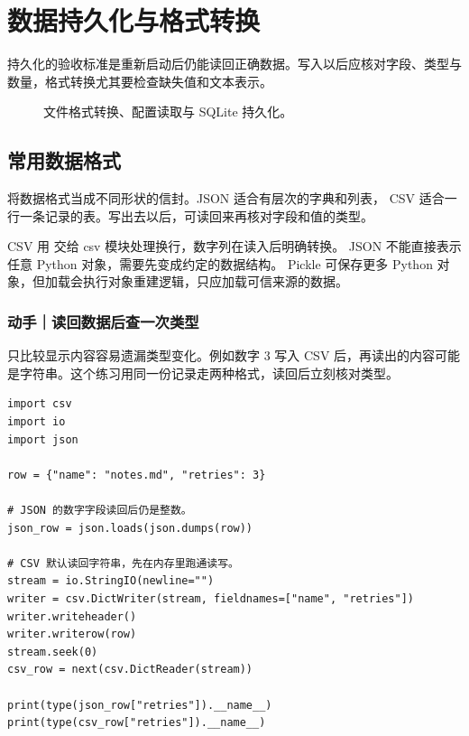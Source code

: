 \chapter{数据持久化与格式转换}
\label{ch:10-outline}

持久化的验收标准是重新启动后仍能读回正确数据。写入以后应核对字段、类型与数量，格式转换尤其要检查缺失值和文本表示。


\begin{figure}[htbp]
  \centering
  \caption*{文件格式转换、配置读取与 SQLite 持久化。}
\end{figure}


\section{常用数据格式}

将数据格式当成不同形状的信封。JSON 适合有层次的字典和列表，
CSV 适合一行一条记录的表。写出去以后，可读回来再核对字段和值的类型。

CSV 用  交给 csv 模块处理换行，数字列在读入后明确转换。
JSON 不能直接表示任意 Python 对象，需要先变成约定的数据结构。
Pickle 可保存更多 Python 对象，但加载会执行对象重建逻辑，只应加载可信来源的数据。

\subsection*{动手｜读回数据后查一次类型}

只比较显示内容容易遗漏类型变化。例如数字 3 写入 CSV 后，再读出的内容可能是字符串。这个练习用同一份记录走两种格式，读回后立刻核对类型。

\begin{lstlisting}[title={\code{round_trip.py}}]
import csv
import io
import json

row = {"name": "notes.md", "retries": 3}

# JSON 的数字字段读回后仍是整数。
json_row = json.loads(json.dumps(row))

# CSV 默认读回字符串，先在内存里跑通读写。
stream = io.StringIO(newline="")
writer = csv.DictWriter(stream, fieldnames=["name", "retries"])
writer.writeheader()
writer.writerow(row)
stream.seek(0)
csv_row = next(csv.DictReader(stream))

print(type(json_row["retries"]).__name__)
print(type(csv_row["retries"]).__name__)
\end{lstlisting}

